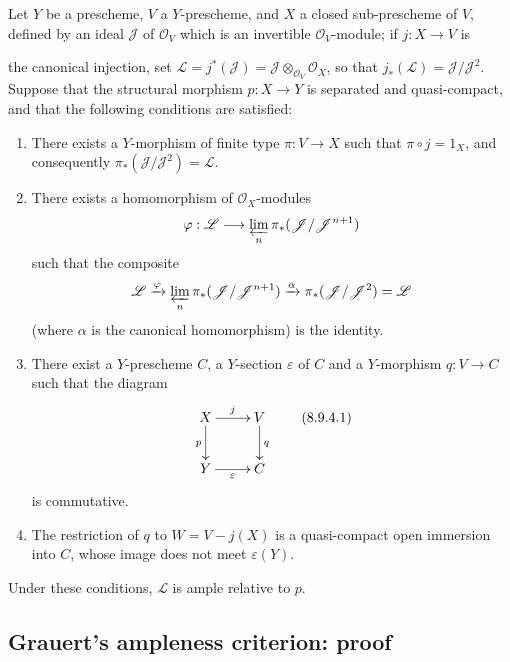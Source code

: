 \begin{proposition}[8.9.4]
\label{II.8.9.4}
Let $Y$ be a prescheme, $V$ a $Y$-prescheme, and $X$ a closed sub-prescheme of
$V$, defined by an ideal $\mathcal{J}$ of $\mathcal{O}_V$ which is an
invertible $\mathcal{O}_V$-module; if $j:X\to V$ is

the canonical injection, set
$\mathcal{L}=j^*(\mathcal{J})=
\mathcal{J}\otimes_{\mathcal{O}_V}\mathcal{O}_X$, so that
$j_*(\mathcal{L})=\mathcal{J}/\mathcal{J}^2$. Suppose that the structural
morphism $p:X\to Y$ is separated and quasi-compact, and that the following
conditions are satisfied:
\begin{enumerate}
  \item[\rm{(i)}] There exists a $Y$-morphism of finite type $\pi:V\to X$
  such that $\pi\circ j=1_X$, and consequently
  $\pi_*(\mathcal{J}/\mathcal{J}^2)=\mathcal{L}$.
  \item[\rm{(ii)}] There exists a homomorphism of $\mathcal{O}_X$-modules
  \[
    \varphi:\mathcal{L}\longrightarrow
    \varprojlim_n\pi_*(\mathcal{J}/\mathcal{J}^{n+1})
  \]
  such that the composite
  \[
    \mathcal{L}\xrightarrow{\varphi}
    \varprojlim_n\pi_*(\mathcal{J}/\mathcal{J}^{n+1})
    \xrightarrow{\alpha}\pi_*(\mathcal{J}/\mathcal{J}^2)=\mathcal{L}
  \]
  (where $\alpha$ is the canonical homomorphism) is the identity.
  \item[\rm{(iii)}] There exist a $Y$-prescheme $C$, a $Y$-section
  $\varepsilon$ of $C$ and a $Y$-morphism $q:V\to C$ such that the diagram
  \begin{equation}
  \label{II.8.9.4.1}
    \xymatrix{
      X\ar[r]^{j}\ar[d]_{p} & V\ar[d]^{q}\\
      Y\ar[r]_{\varepsilon} & C
    }
  \tag{8.9.4.1}
  \end{equation}
  is commutative.
  \item[\rm{(iv)}] The restriction of $q$ to $W=V-j(X)$ is a quasi-compact
  open immersion into $C$, whose image does not meet
  $\varepsilon(Y)$.
\end{enumerate}
Under these conditions, $\mathcal{L}$ is ample relative to $p$.
\end{proposition}


\subsection{Grauert's ampleness criterion: proof}
\label{subsection:II.8.10}

